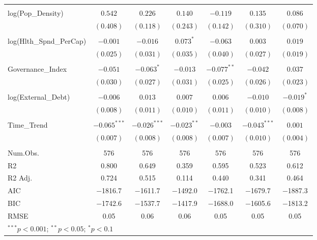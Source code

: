 \begin{longtable}{@{\extracolsep{-3pt}}lcccccc}
                      &&&&&&\\
log(Pop\_Density)        & $0.542$        & $0.226$        & $0.140$       & $-0.119$       & $0.135$        & $0.086$       \\
                      & $(0.408)$      & $(0.118)$      & $(0.243)$     & $(0.142)$      & $(0.310)$      & $(0.070)$     \\
                      &&&&&&\\
log(Hlth\_Spnd\_PerCap)   & $-0.001$       & $-0.016$       & $0.073^{*}$   & $-0.063$       & $0.003$        & $0.019$       \\
                      & $(0.025)$      & $(0.031)$      & $(0.035)$     & $(0.040)$      & $(0.027)$      & $(0.019)$     \\
                      &&&&&&\\
Governance\_Index                   & $-0.051$       & $-0.063^{*}$   & $-0.013$      & $-0.077^{**}$  & $-0.042$       & $0.037$       \\
                      & $(0.030)$      & $(0.027)$      & $(0.031)$     & $(0.025)$      & $(0.026)$      & $(0.023)$     \\
                      &&&&&&\\
log(External\_Debt)   & $-0.006$       & $0.013$        & $0.007$       & $0.006$        & $-0.010$       & $-0.019^{*}$  \\
                      & $(0.008)$      & $(0.011)$      & $(0.010)$     & $(0.011)$      & $(0.010)$      & $(0.008)$     \\
                      &&&&&&\\
Time\_Trend             & $-0.065^{***}$ & $-0.026^{***}$ & $-0.023^{**}$ & $-0.003$       & $-0.043^{***}$ & $0.001$       \\
                      & $(0.007)$      & $(0.008)$      & $(0.008)$     & $(0.007)$      & $(0.010)$      & $(0.004)$     \\
\hline \\[-0.9ex]
Num.Obs. & \num{576} & \num{576} & \num{576} & \num{576} & \num{576} & \num{576}\\
R2 & \num{0.800} & \num{0.649} & \num{0.359} & \num{0.595} & \num{0.523} & \num{0.612}\\
R2 Adj. & \num{0.724} & \num{0.515} & \num{0.114} & \num{0.440} & \num{0.341} & \num{0.464}\\
AIC & \num{-1816.7} & \num{-1611.7} & \num{-1492.0} & \num{-1762.1} & \num{-1679.7} & \num{-1887.3}\\
BIC & \num{-1742.6} & \num{-1537.7} & \num{-1417.9} & \num{-1688.0} & \num{-1605.6} & \num{-1813.2}\\
RMSE & \num{0.05} & \num{0.06} & \num{0.06} & \num{0.05} & \num{0.05} & \num{0.05}\\
\bottomrule
\multicolumn{7}{l}{\scriptsize{$^{***}p<0.001$; $^{**}p<0.05$; $^{*}p<0.1$}}
\label{table:UnitFE_Robst_Region_RQ2}
\end{longtable}


